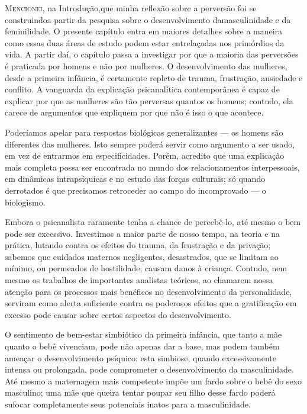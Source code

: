 \textsc{Mencionei,} na Introdução,\idxangusimb[|(] que minha reflexão sobre a perversão foi se
construindo\idxangus[|(] a partir da pesquisa sobre o desenvolvimento da\idxmaessimb[|(]
masculinidade e da feminilidade. O presente capítulo entra em maiores
detalhes sobre a maneira como essas duas áreas de estudo podem estar
entrelaçadas nos primórdios da vida. A partir daí, o capítulo passa a
investigar por que a maioria das perversões é praticada por homens e
não por mulheres. O desenvolvimento das mulheres, desde a primeira
infância, é certamente repleto de trauma, frustração, ansiedade e
conflito. A vanguarda da explicação psicanalítica contemporânea é capaz
de explicar por que as mulheres são tão perversas quantos os homens;
contudo, ela carece de argumentos que expliquem por que não é isso o
que acontece.


Poderíamos apelar para respostas biológicas generalizantes --- os
homens são diferentes das mulheres. Isto sempre poderá servir como
argumento a ser usado, em vez de entrarmos em especificidades. Porém,
acredito que uma explicação mais completa possa ser encontrada no mundo
dos relacionamentos interpessoais, em dinâmicas intrapsíquicas e no
estudo das forças culturais; só quando derrotados é que precisamos
retroceder ao campo do incomprovado --- o biologismo.

Embora o psicanalista raramente tenha a chance de percebê-lo, até
mesmo o bem pode ser excessivo. Investimos a maior parte de nosso
tempo, na teoria e na prática, lutando contra os efeitos do trauma, da
frustração e da privação; sabemos que cuidados maternos negligentes,
desastrados, que se limitam ao mínimo, ou permeados de hostilidade,
causam danos à criança. Contudo, nem mesmo os trabalhos de importantes
analistas teóricos, ao chamarem nossa atenção para os processos mais
benéficos no desenvolvimento da personalidade, serviram como alerta
suficiente contra os poderosos efeitos que a gratificação em excesso
pode causar sobre certos aspectos do desenvolvimento.

O sentimento de bem-estar simbiótico da primeira infância, que tanto
a mãe quanto o bebê vivenciam, pode não apenas dar a base, mas podem
também ameaçar o desenvolvimento psíquico: esta simbiose, quando
excessivamente intensa ou prolongada, pode comprometer o
desenvolvimento da masculinidade. Até mesmo a maternagem mais
competente impõe um fardo sobre o bebê do sexo masculino; uma mãe\idxmaes{} que
queira tentar poupar seu filho desse fardo poderá sufocar completamente
seus potenciais inatos para a masculinidade.


